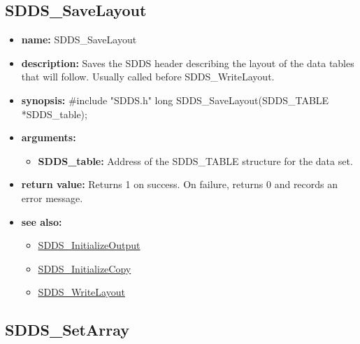 \documentclass[11pt]{article}
\newcommand{\progref}[1]{\hyperref{SDDS_#1}{{\tt SDDS\_#1} (}{)}{SDDS_#1}}
\begin{document}
\subsection{SDDS\_SaveLayout}
\label{SDDS_SaveLayout}

\begin{itemize}
\item {\bf name:}\newline
SDDS\_SaveLayout
\item {\bf description:}\newline
Saves the SDDS header describing the layout of the data tables that will follow. Usually called before SDDS\_WriteLayout.
\item {\bf synopsis:} \#include "SDDS.h"\newline
long SDDS\_SaveLayout(SDDS\_TABLE *SDDS\_table);
\item {\bf arguments:}
\begin{itemize}
\item {\bf SDDS\_table:} Address of the SDDS\_TABLE structure for the data set.
\end{itemize}
\item {\bf return value:}\newline
Returns 1 on success. On failure, returns 0 and records an error message.
\item {\bf see also:}
\begin{itemize}
\item \progref{InitializeOutput}
\item \progref{InitializeCopy}
\item \progref{WriteLayout}
\end{itemize}
\end{itemize}

\subsection{SDDS\_SetArray}
\label{SDDS_SetArray}
\end{document}
